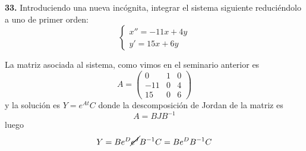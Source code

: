 \begin{ejer} \textbf{33.}
    Introduciendo una nueva incógnita, integrar el sistema siguiente reduciéndolo a
uno de primer orden:
$$\left\{ \begin{array}{l}
         x''=-11x+4y \\
        y'=15x+6y
    \end{array}\right.$$
\end{ejer} 
\begin{sol}
    La matriz asociada al sistema, como vimos en el seminario anterior es 
    $$A=\begin{pmatrix}
        0 & 1 & 0 \\
        -11 & 0 & 4 \\
        15 & 0 & 6
    \end{pmatrix}$$
    y la solución es $Y=e^{At} C$ donde la descomposición de Jordan de la matriz es
    $$ A=B J B^{-1} $$ 
    luego 
    $$Y=B e^D \cancel{e^J} B^{-1} C=B e^D B^{-1} C$$
    
\end{sol}
